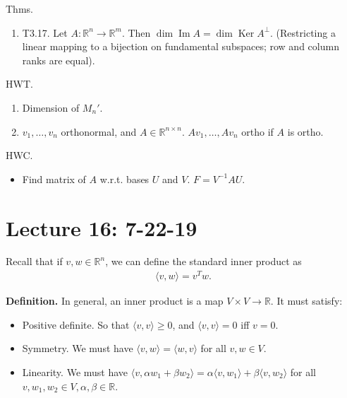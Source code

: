 \documentclass{article}
\newcommand{\RR}{\mathbb{R}}
\DeclareMathOperator{\Ker}{Ker}
\DeclareMathOperator{\Ima}{Im}
\DeclareMathOperator{\Ima}{Im}
\begin{document}
Thms.
\begin{enumerate}
  \item T3.17. Let $A: \RR^n \to \RR^m$. Then $\dim \Ima A = \dim \Ker A^{\perp}$. (Restricting a linear mapping to a bijection on fundamental subspaces; row and column ranks are equal).
\end{enumerate}

HWT.

\begin{enumerate}
  \item Dimension of $M_n'$.
  \item $v_1, \dots, v_n$ orthonormal, and $A \in \RR^{n \times n}$.  $Av_1, \dots, A v_n$ ortho if $A$ is ortho.
\end{enumerate}

HWC.

\begin{itemize}
  \item Find matrix of $A$ w.r.t. bases $U$ and $V$. $F = V^{-1} A U$.
\end{itemize}











\section{Lecture 16: 7-22-19}

Recall that if $v, w \in \RR^n$, we can define the standard inner product as
\begin{align*}
  \langle v, w\rangle = v^T w.
\end{align*}

{\bf Definition.} In general, an inner product is a map $V \times V \to \RR$.  It must satisfy:

\begin{itemize}
  \item Positive definite.  So that $\langle v, v\rangle \geq 0$, and $\langle v, v\rangle = 0$ iff $v = 0$.
  \item Symmetry.  We must have $\langle v, w\rangle = \langle w, v\rangle$ for all $v, w \in V$.
  \item Linearity.  We must have $\langle v, \alpha w_1 + \beta w_2\rangle = \alpha \langle v, w_1\rangle + \beta \langle v, w_2\rangle$ for all $v, w_1, w_2 \in V, \alpha, \beta \in \RR$.
\end{itemize}
\end{document}
